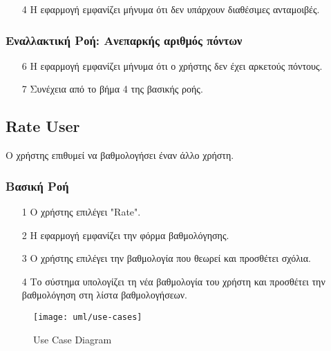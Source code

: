 \begin{enumerate}
    \item[4] Η εφαρμογή εμφανίζει μήνυμα ότι δεν υπάρχουν διαθέσιμες ανταμοιβές.
\end{enumerate}

\subsubsection{Εναλλακτική Ροή: Ανεπαρκής αριθμός πόντων}

\begin{enumerate}
    \item[6] Η εφαρμογή εμφανίζει μήνυμα ότι ο χρήστης δεν έχει αρκετούς πόντους.
    \item[7] Συνέχεια από το βήμα 4 της βασικής ροής.
\end{enumerate}

\newpage

\subsection{Rate User}
\label{uc:rate-user}

Ο χρήστης επιθυμεί να βαθμολογήσει έναν άλλο χρήστη.

\subsubsection{Βασική Ροή}

\begin{enumerate}
    \item[1] Ο χρήστης επιλέγει "Rate".
    \item[2] Η εφαρμογή εμφανίζει την φόρμα βαθμολόγησης.
    \item[3] Ο χρήστης επιλέγει την βαθμολογία που θεωρεί και προσθέτει σχόλια.
    \item[4] Το σύστημα υπολογίζει τη νέα βαθμολογία του χρήστη και προσθέτει
        την βαθμολόγηση στη λίστα βαθμολογήσεων.
\end{enumerate}

\newpage

\begin{figure}
    \centering
    \texttt{[image: uml/use-cases]}
    \caption{Use Case Diagram}
\end{figure}


